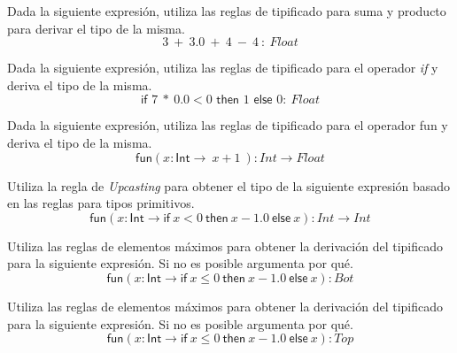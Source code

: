     \bigskip

    \begin{exercise}
        Dada la siguiente expresión, utiliza las reglas de tipificado para suma y producto para derivar el tipo de la misma.
        $$ 3\ +\ 3\text{.}0 \ +\ 4\ - \ 4\ : \ \textit{Float}$$
    \end{exercise}
    \bigskip

    \begin{exercise}
        Dada la siguiente expresión, utiliza las reglas de tipificado para el operador \textit{if} y deriva el tipo de la misma.
        $$\textsf{if } 7\ *\ 0\text{.}0 < 0 \textsf{ then } 1 \textsf{ else } 0 : \ \textit{Float}$$
    \end{exercise}
    \bigskip


    \begin{exercise}
        Dada la siguiente expresión, utiliza las reglas de tipificado para el operador \textsf{fun} y deriva el tipo de la misma.
        $$ \textsf{fun}(x:\textsf{Int} \rightarrow \ x + 1\ ) : \textit{Int}  \rightarrow \textit{Float} $$
    \end{exercise}

    \bigskip

    \begin{exercise}
        Utiliza la regla de \textit{Upcasting} para obtener el tipo de la siguiente expresión basado en las reglas para tipos primitivos.
        $$ \textsf{fun}(x:\textsf{Int} \rightarrow \textsf{if}\ x < 0\ \textsf{then}\ x - 1\text{.}0 \ \textsf{else}\ x ) : \textit{Int}  \rightarrow \textit{Int} $$
    \end{exercise}

    \bigskip

    \begin{exercise}
        Utiliza las reglas de elementos máximos para obtener la derivación del tipificado para la siguiente expresión.
        Si no es posible argumenta por qué.
        $$\textsf{fun}(x:\textsf{Int} \rightarrow \textsf{if}\ x \leq 0\ \textsf{then}\ x - 1\text{.}0 \ \textsf{else}\ x   ) : \textit{Bot} $$
    \end{exercise}
	
	\bigskip

    \begin{exercise}
        Utiliza las reglas de elementos máximos para obtener la derivación del tipificado para la siguiente expresión.
	  Si no es posible argumenta por qué.
        $$ \textsf{fun}(x:\textsf{Int} \rightarrow \textsf{if}\ x \leq 0\ \textsf{then}\ x - 1\text{.}0 \ \textsf{else}\ x) : \textit{Top} $$
    \end{exercise}
 